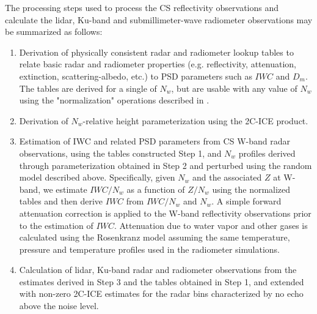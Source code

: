 \documentclass{ametsocV6.1}
\begin{document}
The processing steps used to process the CS reflectivity observations and calculate the lidar, Ku-band and submillimeter-wave radiometer observations may be summarized as follows:
\begin{enumerate}
\item Derivation of physically consistent radar and radiometer lookup tables to relate basic radar and radiometer properties (e.g. reflectivity, attenuation, extinction, scattering-albedo, etc.) to PSD parameters such as $IWC$ and $D_m$. The tables are derived for a single of $N_w$, but are usable with any value of 
$N_w$ using the "normalization" operations described in \citep{grecu2011}.
\item Derivation of $N_w$-relative height parameterization using the 2C-ICE product.
\item Estimation of IWC and related PSD parameters from CS W-band radar observations, using the tables constructed Step 1, and $N_w$ profiles derived through parameterization obtained in Step 2 and perturbed using the random model described above. Specifically, given $N_w$ and the associated $Z$ at W-band, we estimate $IWC/N_w$ as a function of $Z/N_w$ using the normalized tables and then derive $IWC$ from $IWC/N_w$ and $N_w$.  A simple forward attenuation correction \citep{meneghini1978} is applied to the W-band reflectivity observations prior to the estimation of $IWC$.  Attenuation due to water vapor and other gases is calculated using the Rosenkranz model \citep{rosenkranz1998} assuming the same temperature, pressure and temperature profiles used in the radiometer simulations.

\item Calculation of lidar, Ku-band radar and radiometer observations from the estimates derived in Step 3 and the tables obtained in Step 1, and extended with non-zero 2C-ICE estimates for the radar bins characterized by no echo
above the noise level.
\end{enumerate}
\end{document}
